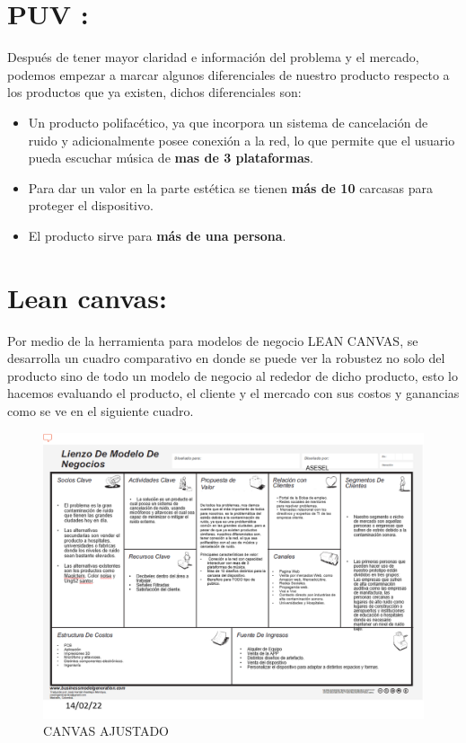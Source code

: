 \documentclass[conference,compsoc,onecolumn]{IEEEtran}
\begin{document}
\section{PUV :}
Después de tener mayor claridad e información del problema y el mercado, podemos empezar a marcar algunos diferenciales de nuestro producto respecto a los productos que ya existen, dichos diferenciales son:
\begin{itemize}
    \item Un producto polifacético, ya que incorpora un sistema de cancelación de ruido y adicionalmente posee conexión a la red, lo que permite que el usuario pueda escuchar música de \textbf{mas de 3 plataformas}. 
    
    \item Para dar un valor en la parte estética se tienen \textbf{más de 10} carcasas para proteger el dispositivo.
    
    \item El producto sirve para \textbf{más de una persona}.\bigskip
\end{itemize}


\section{Lean canvas:}
Por medio de la herramienta para modelos de negocio LEAN CANVAS, se desarrolla un cuadro comparativo en donde se puede ver la robustez no solo del producto sino de todo un modelo de negocio al rededor de dicho producto, esto lo hacemos evaluando el producto, el cliente y el mercado con sus costos y ganancias  como se ve en el siguiente cuadro.

\begin{figure}[H]
    \centering
    \includegraphics[scale = 0.5]{imagenes/LEAN-CANVAS.png}
    \caption{CANVAS AJUSTADO}
    \label{fig:my_label}
\end{figure}
\end{document}
